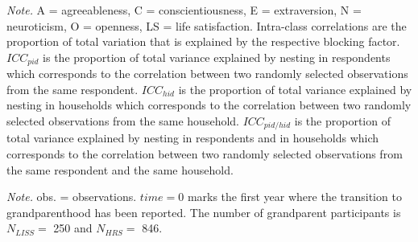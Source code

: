 \documentclass[
  english,
  man, noextraspace]{apa7}
\newenvironment{lltable}{\begin{landscape}\begin{center}\begin{ThreePartTable}}{\end{ThreePartTable}\end{center}\end{landscape}}
\begin{document}
\begin{appendix}
\begin{table}[h]
\begin{center}
\begin{threeparttable}
\begin{tablenotes}[para]
\normalsize{\textit{Note.} A = agreeableness, C = conscientiousness, E = extraversion, N = neuroticism, O = openness, LS = life satisfaction. Intra-class correlations are the proportion of total variation that is explained by the respective blocking factor. $ICC_{pid}$ is the proportion of total variance explained by nesting in respondents which corresponds to the correlation between two randomly selected observations from the same respondent. $ICC_{hid}$ is the proportion of total variance explained by nesting in households which corresponds to the correlation between two randomly selected observations from the same household. $ICC_{pid/hid}$ is the proportion of total variance explained by nesting in respondents and in households which corresponds to the correlation between two randomly selected observations from the same respondent and the same household.}
\end{tablenotes}

\end{threeparttable}
\end{center}

\end{table}










\begin{lltable}

\begin{TableNotes}[para]
\normalsize{\textit{Note.} obs. = observations. \(time=0\) marks
the first year where the transition to grandparenthood has been
reported. The number of grandparent participants is \(N_{LISS}=\) 250
and \(N_{HRS}=\) 846.}
\end{TableNotes}

\small{

}
\end{lltable}
\end{appendix}
\end{document}
